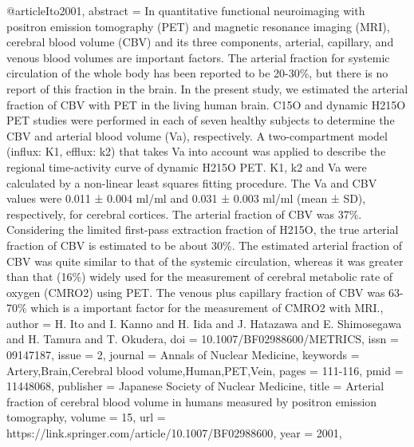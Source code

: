 @article{Ito2001,
   abstract = {In quantitative functional neuroimaging with positron emission tomography (PET) and magnetic resonance imaging (MRI), cerebral blood volume (CBV) and its three components, arterial, capillary, and venous blood volumes are important factors. The arterial fraction for systemic circulation of the whole body has been reported to be 20-30\%, but there is no report of this fraction in the brain. In the present study, we estimated the arterial fraction of CBV with PET in the living human brain. C15O and dynamic H215O PET studies were performed in each of seven healthy subjects to determine the CBV and arterial blood volume (Va), respectively. A two-compartment model (influx: K1, efflux: k2) that takes Va into account was applied to describe the regional time-activity curve of dynamic H215O PET. K1, k2 and Va were calculated by a non-linear least squares fitting procedure. The Va and CBV values were 0.011 ± 0.004 ml/ml and 0.031 ± 0.003 ml/ml (mean ± SD), respectively, for cerebral cortices. The arterial fraction of CBV was 37\%. Considering the limited first-pass extraction fraction of H215O, the true arterial fraction of CBV is estimated to be about 30\%. The estimated arterial fraction of CBV was quite similar to that of the systemic circulation, whereas it was greater than that (16\%) widely used for the measurement of cerebral metabolic rate of oxygen (CMRO2) using PET. The venous plus capillary fraction of CBV was 63-70\% which is a important factor for the measurement of CMRO2 with MRI.},
   author = {H. Ito and I. Kanno and H. Iida and J. Hatazawa and E. Shimosegawa and H. Tamura and T. Okudera},
   doi = {10.1007/BF02988600/METRICS},
   issn = {09147187},
   issue = {2},
   journal = {Annals of Nuclear Medicine},
   keywords = {Artery,Brain,Cerebral blood volume,Human,PET,Vein},
   pages = {111-116},
   pmid = {11448068},
   publisher = {Japanese Society of Nuclear Medicine},
   title = {Arterial fraction of cerebral blood volume in humans measured by positron emission tomography},
   volume = {15},
   url = {https://link.springer.com/article/10.1007/BF02988600},
   year = {2001},
}